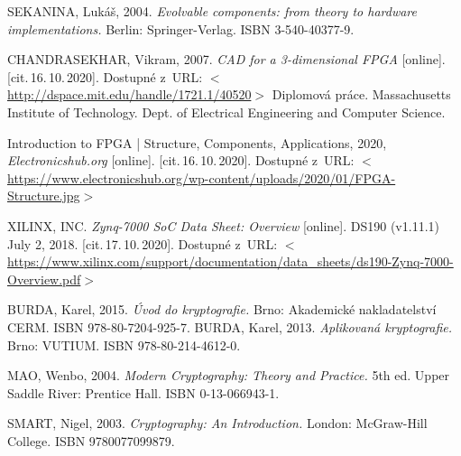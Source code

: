 

\begin{thebibliography}{99}

    \label{source:fpgaSekanina}
    SEKANINA, Lukáš, 
    2004. 
    \emph{Evolvable components: from theory to hardware implementations.} 
    Berlin: Springer-Verlag. 
    ISBN 3-540-40377-9.

    \label{source:fpgaMIT}
    CHANDRASEKHAR, Vikram, 
    2007. 
    \emph{CAD for a 3-dimensional FPGA} [online]. 
    [cit.\,16.\,10.\,2020]. 
    Dostupné z~URL: \(<\)\url{http://dspace.mit.edu/handle/1721.1/40520}\(>\) 
    Diplomová práce. 
    Massachusetts Institute of Technology. 
    Dept. of Electrical Engineering and Computer Science.

    \label{source:FPGAarchitecture}
    Introduction to FPGA | Structure, Components, Applications, 
    2020, \emph{Electronicshub.org}
    \/[online]. 
    [cit.\,16.\,10.\,2020].
    Dostupné z~URL:
    \(<\)\url{https://www.electronicshub.org/wp-content/uploads/2020/01/FPGA-Structure.jpg}\(>\)
    
    \label{source:zynq-7000}
    XILINX, INC. 
    \emph{Zynq-7000 SoC Data Sheet: Overview}
    \/[online]. 
    DS190 (v1.11.1) July 2, 2018. 
    [cit.\,17.\,10.\,2020].
    Dostupné z~URL:
    \(<\)\url{https://www.xilinx.com/support/documentation/data_sheets/ds190-Zynq-7000-Overview.pdf}\(>\)
 
    \label{source:burdaUvod}
    BURDA, Karel, 
    2015. 
    \emph{Úvod do kryptografie.} 
    Brno: Akademické nakladatelství CERM. 
    ISBN 978-80-7204-925-7.
    \label{source:burdaAplikovana}
    BURDA, Karel, 
    2013. 
    \emph{Aplikovaná kryptografie.} 
    Brno: VUTIUM. 
    ISBN 978-80-214-4612-0.
    
    \label{source:MaoWenbo}
    MAO, Wenbo, 
    2004. 
    \emph{Modern Cryptography: Theory and Practice.} 
    5th ed. 
    Upper Saddle River: Prentice Hall. 
    ISBN 0-13-066943-1.
    
    \label{source:niguel}
    SMART, Nigel, 
    2003. 
    \emph{Cryptography: An Introduction.} 
    London: McGraw-Hill College. 
    ISBN 9780077099879.
    

\end{thebibliography}
